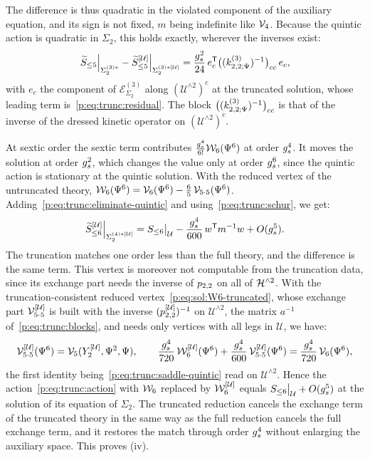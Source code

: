 The difference is thus quadratic in the violated component of the auxiliary equation, and its sign is not fixed, $m$ being indefinite like $\vertex{4}$.
Because the quintic action is quadratic in $\Sigma_2$, this holds exactly, wherever the inverses exist:
\begin{equation}
  \label{p:eq:trunc:exact-difference}
  \caction[\le 5] \Big|_{\Sigma_2^{(3)*}}
    - \caction[\le 5]^{[\mathcal U]} \Big|_{\Sigma_2^{(3)*[\mathcal U]}}
    = \frac{\gs^2}{24} \, e_c^{\mathsf T} \big( (\kin{2}{\Psi}{3})^{-1} \big)_{cc} \, e_c,
\end{equation}
with $e_c$ the component of $\mathcal E^{(3)}_{\Sigma_2}$ along $(\mathcal U^{\wedge 2})^c$ at the truncated solution, whose leading term is~\eqref{p:eq:trunc:residual}.
The block $\big( (\kin{2}{\Psi}{3})^{-1} \big)_{cc}$ is that of the inverse of the dressed kinetic operator on $(\mathcal U^{\wedge 2})^c$.

At sextic order the sextic term contributes $\tfrac{\gs^4}{6!} \dvertex{6}(\Psi^6)$ at order $\gs^4$.
It moves the solution at order $\gs^2$, which changes the value only at order $\gs^6$, since the quintic action is stationary at the quintic solution.
With the reduced vertex of the untruncated theory, $\dvertex{6}(\Psi^6) = \vertex{6}(\Psi^6) - \tfrac{6}{5} \, \vertex{5 \cdot 5}(\Psi^6)$.
Adding~\eqref{p:eq:trunc:eliminate-quintic} and using~\eqref{p:eq:trunc:schur}, we get:
\begin{equation}
  \label{p:eq:trunc:eliminate-sextic}
  \caction[\le 6]^{[\mathcal U]} \Big|_{\Sigma_2^{(4)*[\mathcal U]}}
    = S_{\le 6} \big|_{\mathcal U}
      - \frac{\gs^4}{600} \, w^{\mathsf T} m^{-1} w
      + O(\gs^5).
\end{equation}
The truncation matches one order less than the full theory, and the difference is the same term.
This vertex is moreover not computable from the truncation data, since its exchange part needs the inverse of $\sprod{2}{2}$ on all of $\Hn{2}$.
With the truncation-consistent reduced vertex~\eqref{p:eq:sol:W6-truncated}, whose exchange part $\vertex{5 \cdot 5}^{[\mathcal U]}$ is built with the inverse $(\sprod{2}{2}^{[\mathcal U]})^{-1}$ on $\mathcal U^{\wedge 2}$, the matrix $a^{-1}$ of~\eqref{p:eq:trunc:blocks}, and needs only vertices with all legs in $\mathcal U$, we have:
\begin{equation}
  \label{p:eq:trunc:W6-truncated}
  \vertex{5 \cdot 5}^{[\mathcal U]}(\Psi^6)
    = \vertex{5}(Y_2^{[\mathcal U]}, \Psi^2, \Psi),
  \qquad
  \frac{\gs^4}{720} \, \dvertex{6}^{[\mathcal U]}(\Psi^6)
    + \frac{\gs^4}{600} \, \vertex{5 \cdot 5}^{[\mathcal U]}(\Psi^6)
    = \frac{\gs^4}{720} \, \vertex{6}(\Psi^6),
\end{equation}
the first identity being~\eqref{p:eq:trunc:saddle-quintic} read on $\mathcal U^{\wedge 2}$.
Hence the action~\eqref{p:eq:trunc:action} with $\dvertex{6}$ replaced by $\dvertex{6}^{[\mathcal U]}$ equals $S_{\le 6} \big|_{\mathcal U} + O(\gs^5)$ at the solution of its equation of $\Sigma_2$.
The truncated reduction cancels the exchange term of the truncated theory in the same way as the full reduction cancels the full exchange term, and it restores the match through order $\gs^4$ without enlarging the auxiliary space.
This proves (iv).

